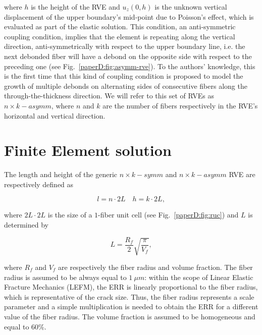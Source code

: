 where $h$ is the height of the RVE and $u_{z}\left(0,h\right)$ is the unknown vertical displacement of the upper boundary's mid-point due to Poisson's effect, which is evaluated as part of the elastic solution. This condition, an anti-symmetric coupling condition, implies that the element is repeating along the vertical direction, anti-symmetrically with respect to the upper boundary line, i.e. the next debonded fiber will have a debond on the opposite side with respect to the preceding one (see Fig.~\ref{paperD:fig:asymm-rve}). To the authors' knowledge, this is the first time that this kind of coupling condition is proposed to model the growth of multiple debonds on alternating sides of consecutive fibers along the through-the-thickness direction. We will refer to this set of RVEs as $n \times k-asymm$, where $n$ and $k$ are the number of fibers respectively in the RVE's horizontal and vertical direction.




\section{Finite Element solution}

The length and height of the generic $n \times k-symm$ and $n \times k-asymm$ RVE are respectively defined as

\begin{equation}
l=n\cdot2L\quad h=k\cdot2L,
\end{equation}

where $2L\cdot2L$ is the size of a $1$-fiber unit cell (see Fig.~\ref{paperD:fig:ruc}) and $L$ is determined by

\begin{equation}
L=\frac{R_{f}}{2}\sqrt{\frac{\pi}{V_{f}}},
\end{equation}

where $R_{f}$ and $V_{f}$ are respectively the fiber radius and volume fraction. The fiber radius is assumed to be always equal to $1\ \mu m$: within the scope of Linear Elastic Fracture Mechanics (LEFM), the ERR is linearly proportional to the fiber radius, which is representative of the crack size. Thus, the fiber radius represents a scale parameter and a simple multiplication is needed to obtain the ERR for a different value of the fiber radius. The volume fraction is assumed to be homogeneous and equal to $60\%$.

